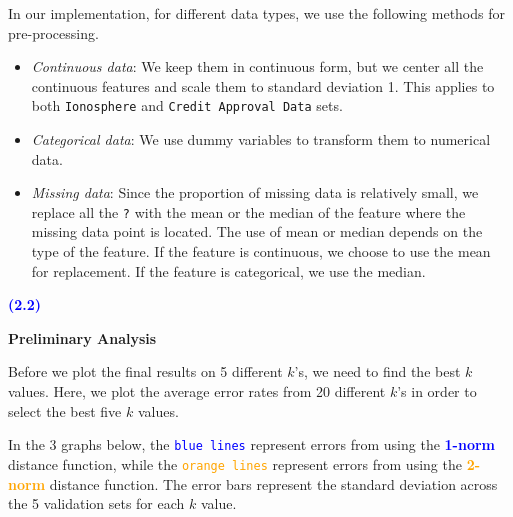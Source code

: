\documentclass{article}
\newcommand{\code}[1]{\texttt{#1}}
\newcommand{\qnum}[1]{\noindent\textcolor{blue}{\textbf{(#1)}}}
\begin{document}
In our implementation, for different data types, we use the following methods for pre-processing.
\begin{itemize}
    \item \textsl{Continuous data}: We keep them in continuous form, but we center all the continuous features and scale them to standard deviation 1. This applies to both \code{Ionosphere} and \code{Credit Approval Data} sets.
    
    \item \textsl{Categorical data}: We use dummy variables to transform them to numerical data.
    
    \item \textsl{Missing data}: Since the proportion of missing data is relatively small, we replace all the \code{?} with the mean or the median of the feature where the missing data point is located.
    The use of mean or median depends on the type of the feature. If the feature is continuous, we choose to use the mean for replacement. If the feature is categorical, we use the median.
\end{itemize}



\bigskip\bigskip




\qnum{2.2}
\bigskip

\noindent\textbf{Preliminary Analysis}
\bigskip

Before we plot the final results on 5 different $k$'s, we need to find the best $k$ values.
Here, we plot the average error rates from 20 different $k$'s in order to select the best five $k$ values.

In the 3 graphs below, the \textcolor{blue}{\code{blue lines}} represent errors from using the
\textcolor{blue}{\textbf{1-norm}} distance function, 
while the \textcolor{orange}{\code{orange lines}} represent errors from using the 
\textcolor{orange}{\textbf{2-norm}} distance function.
The error bars represent the standard deviation across the 5 validation sets for each $k$ value.
\end{document}
